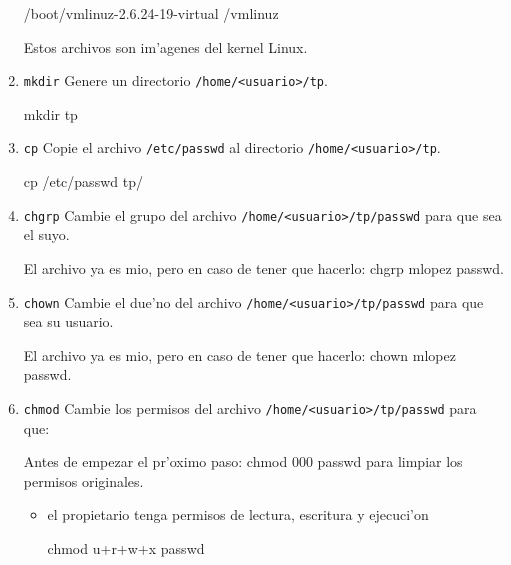 \begin{enumerate}
\begin{envRespuesta}
/boot/vmlinuz-2.6.24-19-virtual
/vmlinuz
\end{envRespuesta}

Estos archivos son im'agenes del kernel Linux.

\item \texttt{mkdir} Genere un directorio \texttt{/home/<usuario>/tp}.

\begin{envRespuesta}
mkdir tp
\end{envRespuesta}

\item \texttt{cp} Copie el archivo \texttt{/etc/passwd} al directorio \texttt{/home/<usuario>/tp}.

\begin{envRespuesta}
cp /etc/passwd tp/
\end{envRespuesta}

\item \texttt{chgrp} Cambie el grupo del archivo \texttt{/home/<usuario>/tp/passwd} para que sea el suyo.

\begin{envRespuesta}
El archivo ya es mio, pero en caso de tener que hacerlo: chgrp mlopez passwd.
\end{envRespuesta}

\item \texttt{chown} Cambie el due'no del archivo \texttt{/home/<usuario>/tp/passwd} para que sea su usuario.

\begin{envRespuesta}
El archivo ya es mio, pero en caso de tener que hacerlo: chown mlopez passwd.
\end{envRespuesta}

\item \texttt{chmod} Cambie los permisos del archivo \texttt{/home/<usuario>/tp/passwd} para que:

\begin{envRespuesta}
Antes de empezar el pr'oximo paso: chmod 000 passwd para limpiar los permisos originales.
\end{envRespuesta}
\begin{itemize}
\item el propietario tenga permisos de lectura, escritura y ejecuci'on

\begin{envRespuesta}
chmod u+r+w+x passwd
\end{envRespuesta}


\end{itemize}
\end{enumerate}
